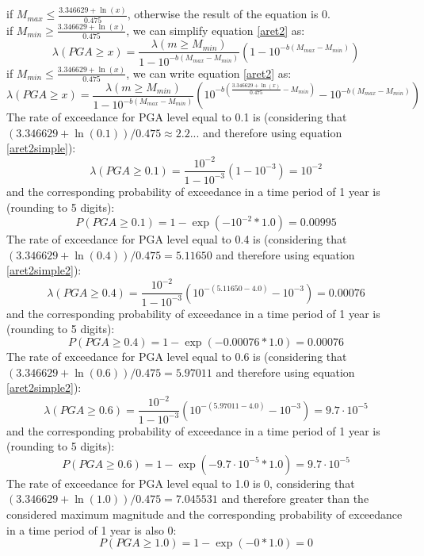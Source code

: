 %
if $M_{max} \leq  \frac{3.346629 + \ln(x)}{0.475}$, otherwise the result of the
equation is 0.\\ if $M_{min} \geq  \frac{3.346629 + \ln(x)}{0.475}$, we can
simplify equation \ref{aret2} as:
%
\begin{equation}
\label{aret2simple}
\lambda(PGA \geq x) =  \frac{\lambda(m\geq M_{min})}{1 - 10^{-b(M_{max} - M_{min})}} (1 - 10^{-b(M_{max} - M_{min})})
\end{equation}
if $M_{min} \leq  \frac{3.346629 + \ln(x)}{0.475}$, we can write equation \ref{aret2} as:
\begin{equation}
\label{aret2simple2}
\lambda(PGA \geq x) =  \frac{\lambda(m\geq M_{min})}{1 - 10^{-b(M_{max} -
M_{min})}} (10^{-b( \frac{3.346629 + \ln(x)}{0.475} - M_{min})} - 10^{-b(M_{max} - M_{min})})
\end{equation}
%
The rate of exceedance for PGA level equal to 0.1 is (considering that
$(3.346629 +\ln(0.1)) / 0.475 \approx 2.2...$ and therefore using equation
\ref{aret2simple}):
%
\begin{equation}
\lambda(PGA \geq 0.1) =  \frac{10^{-2}}{1 - 10^{-3}} (1 - 10^{-3}) = 10^{-2}
\end{equation}
and the corresponding probability of exceedance in a time period of 1 year is (rounding to 5 digits):
\begin{equation}
P(PGA \geq 0.1) = 1 - \exp(- 10^{-2} * 1.0) = 0.00995
\end{equation}
The rate of exceedance for PGA level equal to 0.4 is (considering that
$(3.346629 +\ln(0.4)) / 0.475 = 5.11650$ and therefore using equation \ref{aret2simple2}):
\begin{equation}
\lambda(PGA \geq 0.4) =  \frac{10^{-2}}{1 - 10^{-3}} (10^{-(5.11650 - 4.0)} - 10^{-3}) = 0.00076
\end{equation}
and the corresponding probability of exceedance in a time period of 1 year is (rounding to 5 digits):
\begin{equation}
P(PGA \geq 0.4) = 1 - \exp(- 0.00076 * 1.0) = 0.00076
\end{equation}
The rate of exceedance for PGA level equal to 0.6 is (considering that
$(3.346629 +\ln(0.6)) / 0.475 = 5.97011$ and therefore using equation \ref{aret2simple2}):
\begin{equation}
\lambda(PGA \geq 0.6) =  \frac{10^{-2}}{1 - 10^{-3}} (10^{-(5.97011 - 4.0)} - 10^{-3}) = 9.7 \cdot 10^{-5}
\end{equation}
and the corresponding probability of exceedance in a time period of 1 year is (rounding to 5 digits):
\begin{equation}
P(PGA \geq 0.6) = 1 - \exp(- 9.7 \cdot 10^{-5} * 1.0) = 9.7 \cdot 10^{-5}
\end{equation}
The rate of exceedance for PGA level equal to 1.0 is 0, considering that  
$(3.346629 +\ln(1.0)) / 0.475 = 7.045531$ and therefore greater than the 
considered maximum magnitude and the corresponding probability of 
exceedance in a time period of 1 year is also 0:
\begin{equation}
P(PGA \geq 1.0) = 1 - \exp(- 0 * 1.0) = 0
\end{equation}
%
\clearpage
%
